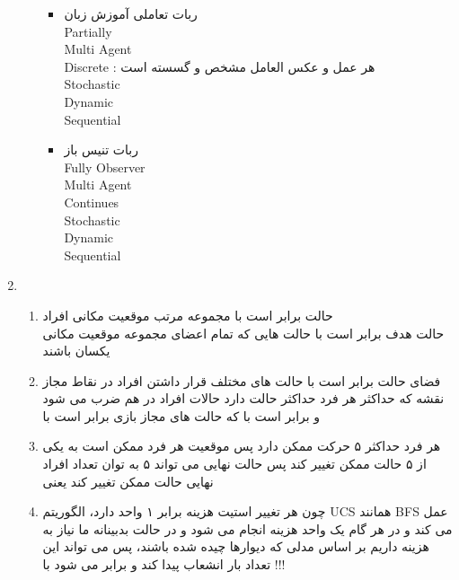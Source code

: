 \documentclass[11pt]{article}
\begin{document}
\begin{enumerate}
\begin{enumerate}
\begin{itemize}
		\item
		ربات تعاملی آموزش زبان\\
		Partially\\
		Multi Agent\\
		Discrete :‌ هر عمل و عکس العامل مشخص و گسسته است\\
		Stochastic\\
		Dynamic\\
		Sequential\\
		
		\item
		ربات تنیس باز\\
		
		Fully Observer\\
		Multi Agent\\
		Continues\\
		Stochastic\\
		Dynamic\\
		Sequential\\
		
	\end{itemize}
	\end{enumerate}
		\item
		\begin{enumerate}
			\item 
			حالت برابر است با مجموعه مرتب موقعیت مکانی افراد\\
			حالت هدف برابر است با حالت هایی که تمام اعضای مجموعه موقعیت مکانی یکسان باشند\\
			\item
			فضای حالت برابر است با حالت های مختلف قرار داشتن افراد در نقاط مجاز نقشه که حداکثر هر فرد حداکثر
			  حالت دارد حالات افراد در هم ضرب می شود و برابر است با 
		که حالت های مجاز بازی برابر است با	
		\\
		
		\item
		هر فرد حداکثر ۵ حرکت ممکن دارد پس موقعیت هر فرد ممکن است به یکی از ۵ حالت ممکن تغییر کند پس حالت نهایی می تواند ۵ به توان تعداد افراد نهایی حالت ممکن تغییر کند یعنی 
		\\
		\item
		چون هر تغییر استیت هزینه برابر ۱ واحد دارد، الگوریتم UCS همانند BFS عمل می کند و در هر گام یک واحد هزینه انجام می شود و در حالت بدبینانه ما نیاز به 
		 هزینه داریم بر اساس مدلی که دیوارها چیده شده باشند، پس می تواند این تعداد بار انشعاب پیدا کند و برابر می شود با
		  !!!\\
		 

\end{enumerate}
\end{enumerate}
\end{document}
